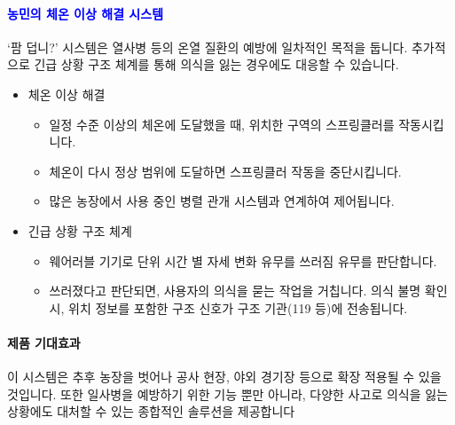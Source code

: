 \documentclass[12pt]{article}
\begin{document}
            \paragraph{\textbf{\textcolor{blue}{농민의 체온 이상 해결 시스템}}}
            `팜 덥니?' 시스템은 열사병 등의 온열 질환의 예방에 일차적인 목적을 둡니다.
            추가적으로 긴급 상황 구조 체계를 통해 의식을 잃는 경우에도 대응할 수 있습니다.
            \begin{itemize}
                \item 체온 이상 해결
                \begin{itemize}
                    \item 일정 수준 이상의 체온에 도달했을 때, 위치한 구역의 스프링클러를 작동시킵니다.
                    \item 체온이 다시 정상 범위에 도달하면 스프링클러 작동을 중단시킵니다.
                    \item 많은 농장에서 사용 중인 병렬 관개 시스템과 연계하여 제어됩니다.
                \end{itemize}
                \item 긴급 상황 구조 체계
                \begin{itemize}
                    \item 웨어러블 기기로 단위 시간 별 자세 변화 유무를 쓰러짐 유무를 판단합니다.
                    \item 쓰러졌다고 판단되면, 사용자의 의식을 묻는 작업을 거칩니다. 의식 불명 확인 시, 위치 정보를 포함한 구조 신호가 구조 기관(119 등)에 전송됩니다.
                \end{itemize}
            \end{itemize}
            \paragraph{\textbf{제품 기대효과}}
                이 시스템은 추후 농장을 벗어나 공사 현장, 야외 경기장 등으로 확장 적용될 수 있을 것입니다. 또한 일사병을 예방하기 위한 기능 뿐만 아니라, 다양한 사고로 의식을 잃는 상황에도 대처할 수 있는 종합적인 솔루션을 제공합니다
\end{document}
